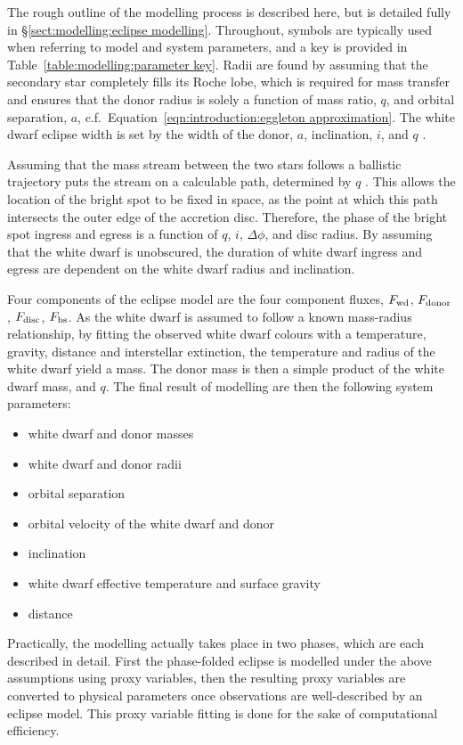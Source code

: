 The rough outline of the modelling process is described here, but is detailed fully in \S\ref{sect:modelling:eclipse modelling}. Throughout, symbols are typically used when referring to model and system parameters, and a key is provided in Table~\ref{table:modelling:parameter key}.
Radii are found by assuming that the secondary star completely fills its Roche lobe, which is required for mass transfer and ensures that the donor radius is solely a function of mass ratio, $q$, and orbital separation, $a$, c.f.~Equation~\ref{eqn:introduction:eggleton approximation}.
The white dwarf eclipse width is set by the width of the donor, $a$, inclination, $i$, and $q$ \citep{bailey1979}.

Assuming that the mass stream between the two stars follows a ballistic trajectory puts the stream on a calculable path, determined by $q$ \citep{Lubow1975}. This allows the location of the bright spot to be fixed in space, as the point at which this path intersects the outer edge of the accretion disc. Therefore, the phase of the bright spot ingress and egress is a function of $q$, $i$, $\Delta\phi$, and disc radius.
By assuming that the white dwarf is unobscured, the duration of white dwarf ingress and egress are dependent on the white dwarf radius and inclination.

Four components of the eclipse model are the four component fluxes, $F_{\rm wd}$, $F_{\rm donor}$, $F_{\rm disc}$, $F_{\rm bs}$.
As the white dwarf is assumed to follow a known mass-radius relationship, by fitting the observed white dwarf colours with a temperature, gravity, distance and interstellar extinction, the temperature and radius of the white dwarf yield a mass. The donor mass is then a simple product of the white dwarf mass, and $q$.
The final result of modelling are then the following system parameters:
\begin{itemize}
    \setlength\itemsep{0em}
    \item white dwarf and donor masses
    \item white dwarf and donor radii
    \item orbital separation
    \item orbital velocity of the white dwarf and donor
    \item inclination
    \item white dwarf effective temperature and surface gravity
    \item distance
\end{itemize}

Practically, the modelling actually takes place in two phases, which are each described in detail. First the phase-folded eclipse is modelled under the above assumptions using proxy variables, then the resulting proxy variables are converted to physical parameters once observations are well-described by an eclipse model. This proxy variable fitting is done for the sake of computational efficiency.

